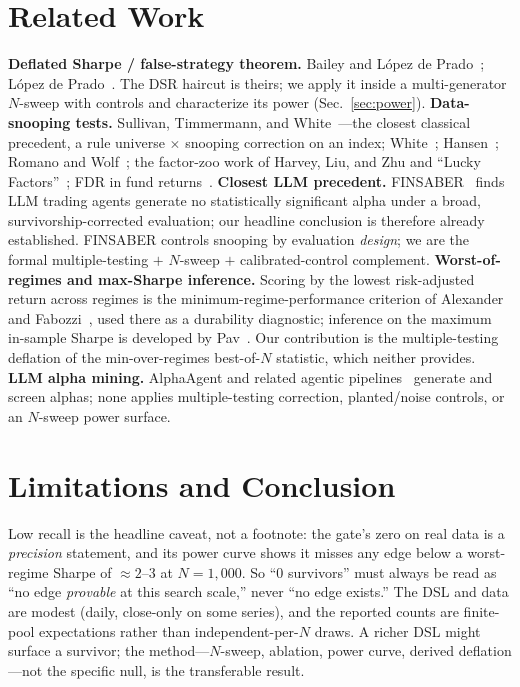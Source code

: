 \documentclass[sigconf,review,anonymous]{acmart}
\begin{document}
\section{Related Work}
\textbf{Deflated Sharpe / false-strategy theorem.} Bailey and L\'opez de Prado~\cite{bailey2014dsr,bailey2016pbo}; L\'opez de Prado~\cite{lopezdeprado2018}. The DSR haircut is theirs; we apply it inside a multi-generator $N$-sweep with controls and characterize its power (Sec.~\ref{sec:power}).
\textbf{Data-snooping tests.} Sullivan, Timmermann, and White~\cite{stw1999}---the closest classical precedent, a rule universe $\times$ snooping correction on an index; White~\cite{white2000}; Hansen~\cite{hansen2005}; Romano and Wolf~\cite{romanowolf2005}; the factor-zoo work of Harvey, Liu, and Zhu and ``Lucky Factors''~\cite{harvey2016,harveyliu2021}; FDR in fund returns~\cite{barras2010}.
\textbf{Closest LLM precedent.} FINSABER~\cite{finsaber2026} finds LLM trading agents generate no statistically significant alpha under a broad, survivorship-corrected evaluation; our headline conclusion is therefore already established. FINSABER controls snooping by evaluation \emph{design}; we are the formal multiple-testing $+$ $N$-sweep $+$ calibrated-control complement.
\textbf{Worst-of-regimes and max-Sharpe inference.} Scoring by the lowest risk-adjusted return across regimes is the minimum-regime-performance criterion of Alexander and Fabozzi~\cite{alexander2026mrp}, used there as a durability diagnostic; inference on the maximum in-sample Sharpe is developed by Pav~\cite{pav2019}. Our contribution is the multiple-testing deflation of the min-over-regimes best-of-$N$ statistic, which neither provides.
\textbf{LLM alpha mining.} AlphaAgent and related agentic pipelines~\cite{alphaagent2025} generate and screen alphas; none applies multiple-testing correction, planted/noise controls, or an $N$-sweep power surface.

\section{Limitations and Conclusion}
Low recall is the headline caveat, not a footnote: the gate's zero on real data is a \emph{precision} statement, and its power curve shows it misses any edge below a worst-regime Sharpe of ${\approx}2$--$3$ at $N{=}1{,}000$. So ``0 survivors'' must always be read as ``no edge \emph{provable} at this search scale,'' never ``no edge exists.'' The DSL and data are modest (daily, close-only on some series), and the reported counts are finite-pool expectations rather than independent-per-$N$ draws. A richer DSL might surface a survivor; the method---$N$-sweep, ablation, power curve, derived deflation---not the specific null, is the transferable result.
\end{document}
